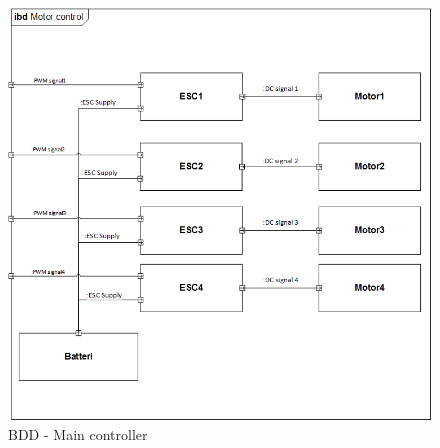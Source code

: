 \begin{figure}[H]
\centering
\includegraphics[width=1\textwidth]{Billeder/IBD/ibd_motorcontrol}
\caption{BDD - Main controller}
\label{fig:bdd_maincontroller}
\end{figure}
